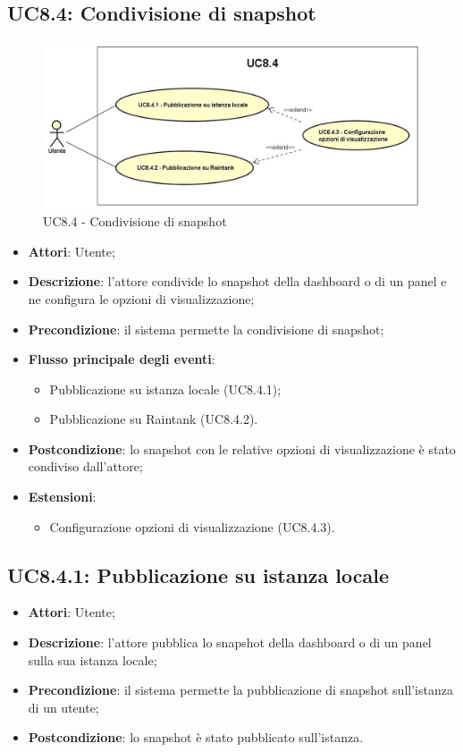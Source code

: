 \subsection{UC8.4: Condivisione di snapshot}
\hypertarget{UC8.4}{}
\begin{figure} [H]
	\centering
	\includegraphics[scale=0.45]{Img/UC8-4}
	\caption{UC8.4 - Condivisione di snapshot}\label{}
\end{figure}
\begin{itemize}
	\item \textbf{Attori}: Utente;
	\item \textbf{Descrizione}: l'attore condivide lo snapshot della dashboard o di un panel e ne configura le opzioni di visualizzazione;
	\item \textbf{Precondizione}: il sistema permette la condivisione di snapshot;
	\item \textbf{Flusso principale degli eventi}:
	\begin{itemize}
		\item Pubblicazione su istanza locale (UC8.4.1);
		\item Pubblicazione su Raintank (UC8.4.2).
	\end{itemize}
	\item \textbf{Postcondizione}: lo snapshot con le relative opzioni di visualizzazione è stato condiviso dall'attore;
	\item \textbf{Estensioni}:
	\begin{itemize}
		\item Configurazione opzioni di visualizzazione (UC8.4.3).
	\end{itemize}
\end{itemize}

\subsection{UC8.4.1: Pubblicazione su istanza locale}
\hypertarget{UC8.4.1}{}
\begin{itemize}
	\item \textbf{Attori}: Utente;
	\item \textbf{Descrizione}: l'attore pubblica lo snapshot della dashboard o di un panel sulla sua istanza locale;
	\item \textbf{Precondizione}: il sistema permette la pubblicazione di snapshot sull'istanza di un utente;
	\item \textbf{Postcondizione}: lo snapshot è stato pubblicato sull'istanza.
\end{itemize}

